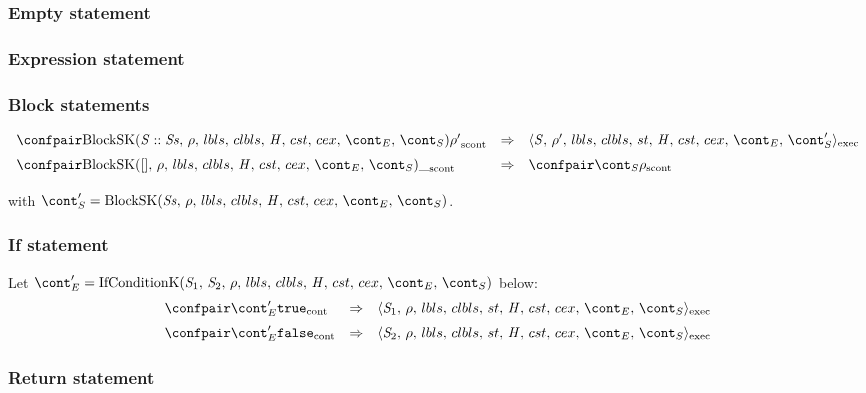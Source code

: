 \documentclass{article}
\begin{document}
\subsubsection{Empty statement}
\label{subsubsec:emtpy-stmt}


\subsubsection{Expression statement}
\label{expression-stmt}

\subsubsection{Block statements}
\[
  \begin{array}{lcl}
	\cesktrans{
		\scontconf{\BlockSK{\stmt :: \stmts}{\env}}{\env'}}{
		\execconf{\stmt}{\env'}{\lbls}{\clbls}{\handler}{\cstrace}{\cex}{\econt}{\scont'}}
		\\[2mm]

	\cesktrans{
		\scontconf{\BlockSK{[]}{\env}}{ \_ }}{
		\scontconf{\scont}{\env}}
		\\[2mm]
  \end{array}
\]
\noindent
with $\scont' = \BlockSK{\stmts}{\env}$.

\subsubsection{If statement}

Let $\econt' = \IfCondK{\stmti{1}}{\stmti{2}}$ below:
\[
  \begin{array}{lcl}
	\contconf{\econt'}{\true} 
	& \Rightarrow &
	\execconf{\stmti{1}}{\env}{\lbls}{\clbls}{\handler}{\cstrace}{\cex}{\econt}{\scont}\\[2mm]

	\contconf{\econt'}{\false} 
	& \Rightarrow &
	\execconf{\stmti{2}}{\env}{\lbls}{\clbls}{\handler}{\cstrace}{\cex}{\econt}{\scont}\\
  \end{array}
\]

\subsubsection{Return statement}
\end{document}
